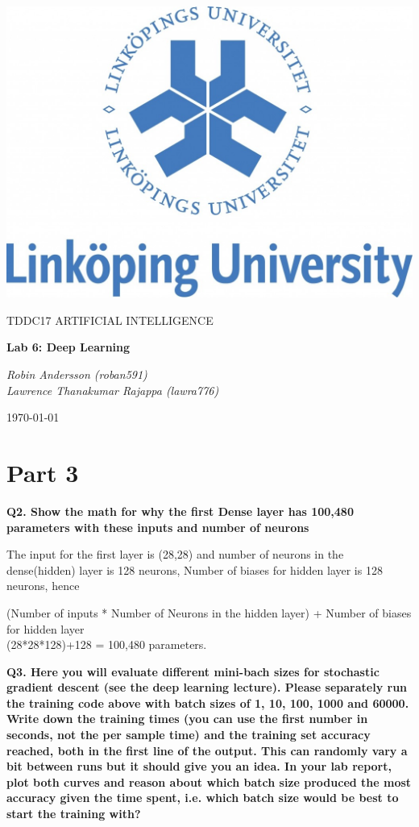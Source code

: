 \documentclass[a4paper,10pt]{article}
\begin{document}
\begin{titlepage}
	\centering
	\includegraphics[width=.6\textwidth]{liu-logo.png}\par
	\vfill
	{\scshape\Large TDDC17 ARTIFICIAL INTELLIGENCE\par}
	{\huge\bfseries Lab 6: Deep Learning\par}
	\vspace{1cm}
	{\large\itshape Robin Andersson (roban591) \\ Lawrence Thanakumar Rajappa (lawra776)\par}
	\vfill
	{\large \today\par}
\end{titlepage}

\section*{Part 3}

\textbf{Q2. Show the math for why the first Dense layer has 100,480 parameters with these inputs and number of neurons}

The input for the first layer is (28,28) and number of neurons in the dense(hidden) layer is 128 neurons,
Number of biases for hidden layer is 128 neurons, hence
\begin{center}
		(Number of inputs * Number of Neurons in the hidden layer) + Number of biases for hidden layer \\
		(28*28*128)+128 = 100,480 parameters.
\end{center}

\textbf{Q3. Here you will evaluate different mini-bach sizes for stochastic gradient descent (see the deep learning lecture). 
Please separately run the training code above with batch sizes of 1, 10, 100, 1000 and 60000. 
Write down the training times (you can use the first number in seconds, not the per sample time) and 
the training set accuracy reached, both in the first line of the output. 
This can randomly vary a bit between runs but it should give you an idea. 
In your lab report, plot both curves and reason about which batch size produced the most accuracy 
given the time spent, i.e. which batch size would be best to start the training with?}
\end{document}
